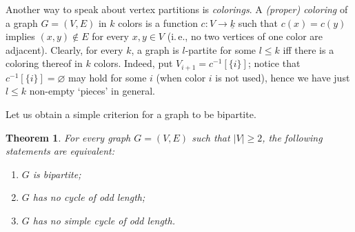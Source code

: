 \documentclass[12pt,notitlepage]{article}
\theoremstyle{plain}
\newtheorem{thm}{Theorem}[section]
\theoremstyle{definition}
\theoremstyle{plain}
\newcommand{\void}{\varnothing}
\newcommand{\ul}[1]{\underline{#1}}
\newcommand{\1}{\mathbf{1}}
\newcommand{\0}{\mathbf{0}}
\begin{document}
Another way to speak about vertex partitions is \emph{colorings}. A \emph{(proper) coloring} of a graph $G = (V, E)$ in $k$ colors is a function $c\colon V \to \ul{k}$ such that $c(x) = c(y)$ implies $(x, y) \notin E$ for every $x, y \in V$ (i.\,e., no two vertices of one color are adjacent). Clearly, for every $k$, a graph is $l$-partite for some $l \leq k$ iff there is a coloring thereof in $k$ colors. Indeed, put $V_{i+1} = c^{-1}[\{ i \}]$; notice that $c^{-1}[\{ i \}] = \void$ may hold for some $i$ (when color $i$ is not used), hence we have just $l \leq k$ non-empty `pieces' in general.

\medskip

Let us obtain a simple criterion for a graph to be bipartite.
\begin{thm}\label{L14:bipartite}
For every graph $G = (V, E)$ such that $|V| \geq 2$, the following statements are equivalent:
\begin{enumerate}
\item $G$ is bipartite;
\item $G$ has no cycle of odd length;
\item $G$ has no simple cycle of odd length.
\end{enumerate}
\end{thm}
\end{document}
